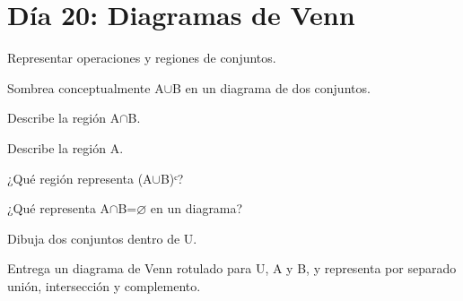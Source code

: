 \section{Día 20: Diagramas de Venn}

\begin{lesson}[id=dia-20-lectura,weight=0]

Representar operaciones y regiones de conjuntos.

\end{lesson}

\begin{activity}[id=dia-20-corta-01,type=short,weight=1]

Sombrea conceptualmente A\(\cup\)B en un diagrama de dos conjuntos.

\end{activity}

\begin{activity}[id=dia-20-corta-02,type=short,weight=1]

Describe la región A\(\cap\)B.

\end{activity}

\begin{activity}[id=dia-20-corta-03,type=short,weight=1]

Describe la región A\B.

\end{activity}

\begin{activity}[id=dia-20-corta-04,type=short,weight=1]

¿Qué región representa (A\(\cup\)B)ᶜ?

\end{activity}

\begin{activity}[id=dia-20-corta-05,type=short,weight=1]

¿Qué representa A\(\cap\)B=\(\varnothing\) en un diagrama?

\end{activity}

\begin{activity}[id=dia-20-corta-06,type=short,weight=1]

Dibuja dos conjuntos dentro de U.

\end{activity}

\begin{activity}[id=dia-20-desarrollo-01,type=long,weight=2]

Entrega un diagrama de Venn rotulado para U, A y B, y representa por separado unión, intersección y complemento.

\end{activity}

